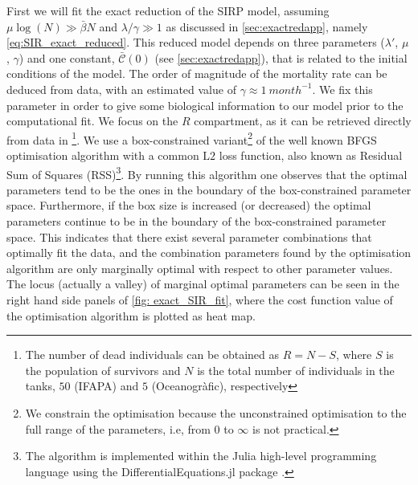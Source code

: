First we will fit the exact reduction of the SIRP model, assuming
$\mu\log(N)\gg\bar{\beta}N$ and $\lambda/\gamma\gg 1$ as discussed in
\cref{sec:exactredapp}, namely \cref{eq:SIR_exact_reduced}.
This reduced model depends on three parameters ($\lambda'$, $\mu$,
$\gamma$) and one constant, $\bar{\mathcal{C}}(0)$ (see
\cref{sec:exactredapp}), that is related to the initial conditions of the
model. The order of magnitude
of the mortality rate can be deduced from data, with an estimated value of
$\gamma\approx\SI{1}{month^{-1}}$. We fix this parameter in order to give some
biological information to our model prior to the computational fit. We focus on
the $R$ compartment, as it can be retrieved directly from data in
\cite{March}\footnote{The number of dead individuals can be obtained as
    $R=N-S$, where $S$ is the population of survivors and $N$ is the total
    number
    of individuals in the tanks,
    $50$ (IFAPA) and $5$ (Oceanogr\`afic), respectively}.
We use a box-constrained variant\footnote{We constrain the optimisation
    because the unconstrained optimisation to the full range of the parameters,
    i.e, from $0$ to $\infty$ is not practical.} of the well known BFGS
optimisation algorithm \cite{BFGS} with a common $\textrm{L}2$ loss function,
also known as Residual Sum of Squares (RSS)\footnote{The algorithm is
    implemented within the Julia high-level programming language \cite{julia}
    using the DifferentialEquations.jl package
    \cite{DifferentialEquations.jl}.}.
By running this algorithm one observes that the optimal parameters tend to be
the ones in the boundary of the box-constrained parameter space.
Furthermore, if the box size is increased (or decreased) the optimal
parameters continue to be in the boundary of the box-constrained parameter
space.
This indicates that there exist several parameter combinations that
optimally fit the data, and the combination parameters found by the
optimisation algorithm are only marginally optimal with respect to other
parameter values. The locus (actually a valley) of marginal optimal parameters
can be seen in the right hand side panels of \cref{fig: exact_SIR_fit}, where
the cost function value of the optimisation algorithm is plotted as heat map.

